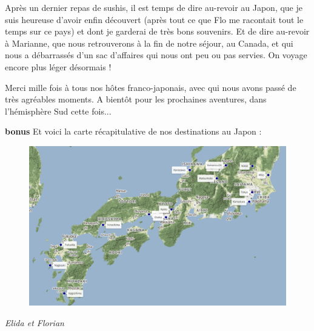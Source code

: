 Après un dernier repas de sushis, il est temps de dire au-revoir au
Japon, que je suis heureuse d'avoir enfin découvert (après tout ce que
Flo me racontait tout le temps sur ce pays) et dont je garderai de très
bons souvenirs. Et de dire au-revoir à Marianne, que nous retrouverons à
la fin de notre séjour, au Canada, et qui nous a débarrassés d'un sac
d'affaires qui nous ont peu ou pas servies. On voyage encore plus léger
désormais !

Merci mille fois à tous nos hôtes franco-japonais, avec qui nous avons
passé de très agréables moments. A bientôt pour les prochaines
aventures, dans l'hémisphère Sud cette fois...

\textbf{bonus} Et voici la carte récapitulative de nos destinations au
Japon :

\begin{figure}
\centering
\includegraphics{maps/Japon.png}
\end{figure}

\emph{Elida et Florian}


